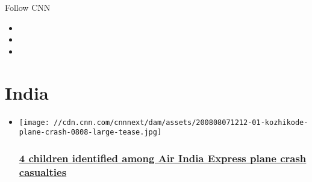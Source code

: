 Follow CNN

\begin{itemize}
\item
\item
\item
\end{itemize}

\hypertarget{india}{%
\section{India}\label{india}}

\begin{itemize}
\item
  \href{/2020/08/08/asia/air-india-express-plane-crash-kerala-intl/index.html}{}

  \texttt{[image: //cdn.cnn.com/cnnnext/dam/assets/200808071212-01-kozhikode-plane-crash-0808-large-tease.jpg]}

  \hypertarget{4-children-identified-among-air-india-express-plane-crash-casualties}{%
  \subsubsection{\texorpdfstring{\href{/2020/08/08/asia/air-india-express-plane-crash-kerala-intl/index.html}{4
  children identified among Air India Express plane crash
  casualties}}{4 children identified among Air India Express plane crash casualties}}\label{4-children-identified-among-air-india-express-plane-crash-casualties}}
\end{itemize}

